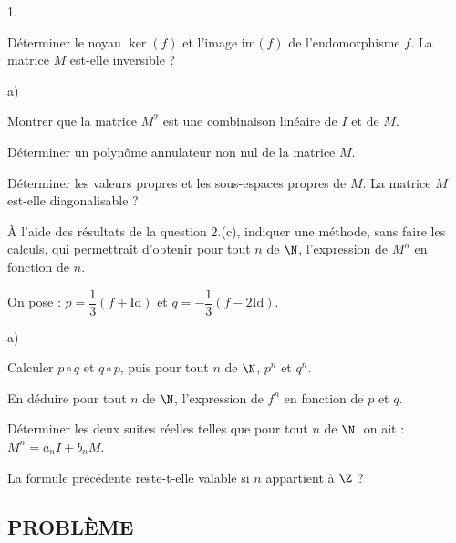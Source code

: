 \documentclass[11pt]{article}%
\begin{document}
\begin{noliste}{1.}
 \setlength{\itemsep}{4mm}
\item Déterminer le noyau $\ker\left( f\right) $ et l'image
$\text{im}\left( f\right) $ de l'endomorphisme $f.$ La matrice $M$
est-elle inversible ?

\item {}

\begin{noliste}{a)}
 \setlength{\itemsep}{2mm}
\item Montrer que la matrice $M^{2}$ est une combinaison linéaire de
$I$
et de $M$.

\item Déterminer un polyn\^{o}me annulateur non nul de la matrice $M$.

\item Déterminer les valeurs propres et les sous-espaces propres de
$M$.
La matrice $M$ est-elle diagonalisable ?
\end{noliste}

\item \`{A} l'aide des résultats de la question 2.(c), indiquer une
méthode, sans faire les calculs, qui permettrait d'obtenir pour tout
$n$
de $\N$, l'expression de $M^{n}$ en fonction de $n$.

\item On pose : $p = \dfrac{1}{3}\left( f + \text{Id}\right) $ et $q =
-\dfrac
{1}{3}\left( f-2\text{Id}\right) $.

\begin{noliste}{a)}
 \setlength{\itemsep}{2mm}
\item Calculer $p\circ q$ et $q\circ p$, puis pour tout $n$ de $\N$,
$p^{n}$ et $q^{n}$.

\item En déduire pour tout $n$ de $\N$, l'expression de $f^{n}$ en
fonction de $p$ et $q$.

\item Déterminer les deux suites réelles telles que pour tout $n$ de
$\N$, on ait : $M^{n} = a_{n}I + b_{n}M$.

\item La formule précédente reste-t-elle valable si $n$ appartient
à $\Z$ ?
\end{noliste}
\end{noliste}

\subsection*{PROBL\`{E}ME}
\end{document}
